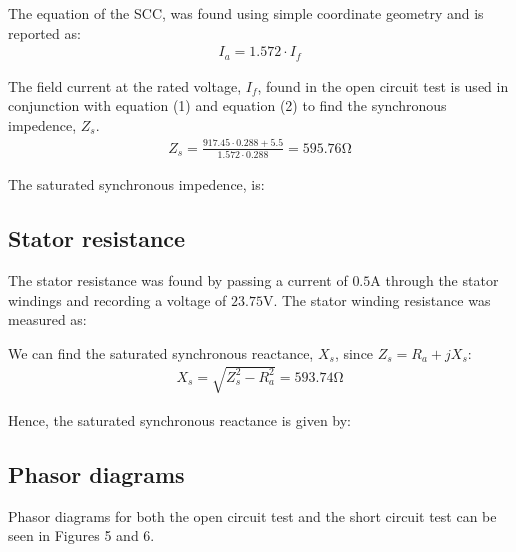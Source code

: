 \documentclass{article}
\begin{document}
The equation of the SCC, was found using simple coordinate geometry and is reported as:
\begin{align}
	I_a = 1.572 \cdot I_f
\end{align}

The field current at the rated voltage, $I_f$, found in the open circuit test is used in conjunction with equation (1) and equation (2) to find the synchronous impedence, $Z_s$.
\begin{align*}
	Z_s = \frac{917.45 \cdot 0.288 + 5.5}{1.572 \cdot 0.288} = 595.76\si{\ohm}
\end{align*}

The saturated synchronous impedence, is:
\begin{center}
\end{center}

\subsection{Stator resistance}
The stator resistance was found by passing a current of $0.5\si{\ampere}$ through the stator windings and recording a voltage of $23.75\si{\volt}$. The stator winding resistance was measured as:
\begin{center}
\end{center}
\vspace{0.5cm}
We can find the saturated synchronous reactance, $X_s$, since $Z_s = R_a +jX_s$:
\begin{align*}
	X_s = \sqrt{Z_s^2 - R_a^2} = 593.74\si{\ohm}
\end{align*}

Hence, the saturated synchronous reactance is given by:
\begin{center}
\end{center}

\subsection{Phasor diagrams}

Phasor diagrams for both the open circuit test and the short circuit test can be seen in Figures 5 and 6.
\end{document}
